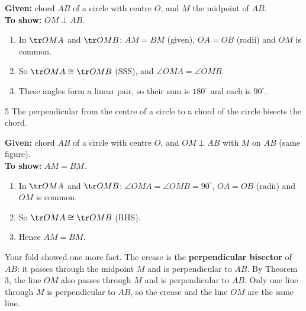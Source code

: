 
\why
\textbf{Given:} chord $AB$ of a circle with centre $O$, and $M$ the midpoint of $AB$.\\
\textbf{To show:} $OM\perp AB$.
\begin{enumerate}[leftmargin=1.8em,itemsep=1pt]
  \item In $\tr OMA$ and $\tr OMB$: $AM=BM$ (given), $OA=OB$ (radii) and $OM$ is common.
  \item So $\tr OMA\cong\tr OMB$ (SSS), and $\angle OMA=\angle OMB$.
  \item These angles form a linear pair, so their sum is $180^\circ$ and each is $90^\circ$.
\end{enumerate}

\begin{theorem}{5}
The perpendicular from the centre of a circle to a chord of the circle bisects the chord.
\end{theorem}

\why
\textbf{Given:} chord $AB$ of a circle with centre $O$, and $OM\perp AB$ with $M$ on $AB$ (same figure).\\
\textbf{To show:} $AM=BM$.
\begin{enumerate}[leftmargin=1.8em,itemsep=1pt]
  \item In $\tr OMA$ and $\tr OMB$: $\angle OMA=\angle OMB=90^\circ$, $OA=OB$ (radii) and $OM$ is common.
  \item So $\tr OMA\cong\tr OMB$ (RHS).
  \item Hence $AM=BM$.
\end{enumerate}

Your fold showed one more fact. The crease is the \textbf{perpendicular bisector} of $AB$: it passes through the midpoint $M$ and is perpendicular to $AB$. By Theorem 3, the line $OM$ also passes through $M$ and is perpendicular to $AB$. Only one line through $M$ is perpendicular to $AB$, so the crease and the line $OM$ are the same line.


